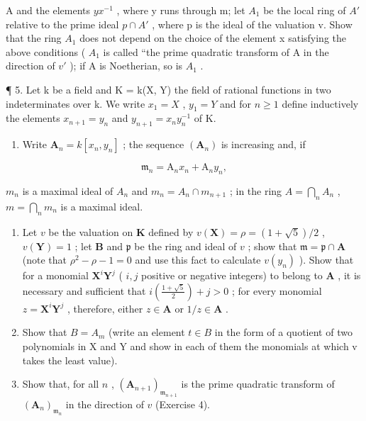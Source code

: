 A and the elements \(yx^{-1}\) , where y runs through m; let \(A_{1}\) be the local ring of \(A'\) relative to the prime ideal \(p \cap A'\) , where p is the ideal of the valuation v. Show that the ring \(A_{1}\) does not depend on the choice of the element x satisfying the above conditions ( \(A_{1}\) is called ``the prime quadratic transform of A in the direction of \(v'\) ); if A is Noetherian, so is \(A_{1}\) .

¶ 5. Let k be a field and K = k(X, Y) the field of rational functions in two indeterminates over k. We write \(x_{1} = X\) , \(y_{1} = Y\) and for \(n \geqslant 1\) define inductively the elements \(x_{n+1} = y_{n}\) and \(y_{n+1} = x_{n}y_{n}^{-1}\) of K.

\begin{enumerate}
\def\labelenumi{(\alph{enumi})}
\tightlist
\item
  Write \(\mathbf{A}_n = k[x_n, y_n]\) ; the sequence \((\mathbf{A}_n)\) is increasing and, if
\end{enumerate}

\[
\mathfrak {m} _ {n} = \mathrm{A} _ {n} x _ {n} + \mathrm{A} _ {n} y _ {n},
\]

\(m_{n}\) is a maximal ideal of \(A_{n}\) and \(m_{n} = A_{n} \cap m_{n+1}\) ; in the ring \(A = \bigcap_{n} A_{n}\) , \(m = \bigcap_{n} m_{n}\) is a maximal ideal.

\begin{enumerate}
\def\labelenumi{(\alph{enumi})}
\setcounter{enumi}{1}
\item
  Let \(v\) be the valuation on \(\mathbf{K}\) defined by \(v(\mathbf{X}) = \rho = (1 + \sqrt{5}) / 2\) , \(v(\mathbf{Y}) = 1\) ; let \(\mathbf{B}\) and \(\mathfrak{p}\) be the ring and ideal of \(v\) ; show that \(\mathfrak{m} = \mathfrak{p} \cap \mathbf{A}\) (note that \(\rho^2 - \rho - 1 = 0\) and use this fact to calculate \(v(y_n)\) ). Show that for a monomial \(\mathbf{X}^i\mathbf{Y}^j\) ( \(i, j\) positive or negative integers) to belong to \(\mathbf{A}\) , it is necessary and sufficient that \(i\left(\frac{1 + \sqrt{5}}{2}\right) + j > 0\) ; for every monomial \(z = \mathbf{X}^i\mathbf{Y}^j\) , therefore, either \(z \in \mathbf{A}\) or \(1/z \in \mathbf{A}\) .
\item
  Show that \(B = A_{m}\) (write an element \(t \in B\) in the form of a quotient of two polynomials in X and Y and show in each of them the monomials at which v takes the least value).
\item
  Show that, for all \(n\) , \((\mathbf{A}_{n+1})_{\mathfrak{m}_{n+1}}\) is the prime quadratic transform of \((\mathbf{A}_n)_{\mathfrak{m}_n}\) in the direction of \(v\) (Exercise 4).
\end{enumerate}

